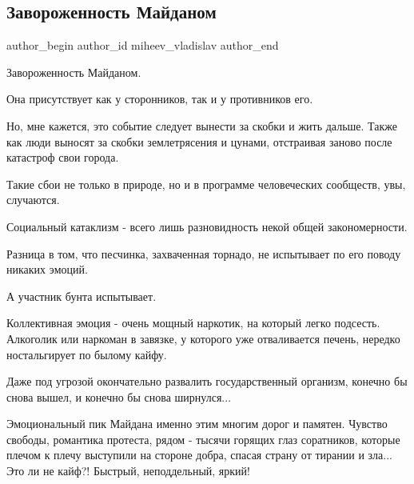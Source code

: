  
 
 
 
 
 
\subsection{Завороженность Майданом}
\label{sec:22_11_2021.fb.miheev_vladislav.1.zavorozhennost_maidan}
 
\ifcmt
 author_begin
   author_id miheev_vladislav
 author_end
\fi

Завороженность Майданом.

Она присутствует как у сторонников, так и у противников его.

Но, мне кажется, это событие следует вынести за скобки и жить дальше. Также как
люди выносят за скобки землетрясения и цунами, отстраивая заново после
катастроф свои города.

Такие сбои не только в природе, но и в программе  человеческих сообществ, увы,
случаются.

Социальный катаклизм - всего лишь разновидность некой общей закономерности.

Разница в том, что песчинка, захваченная торнадо, не испытывает по его поводу
никаких эмоций.

А участник бунта испытывает.

Коллективная эмоция - очень мощный наркотик, на который  легко подсесть.
Алкоголик или наркоман в завязке, у которого уже отваливается печень, нередко
ностальгирует по  былому кайфу.

Даже под угрозой окончательно развалить государственный организм, конечно бы
снова вышел, и конечно бы снова ширнулся...

Эмоциональный пик Майдана именно этим многим дорог и памятен. Чувство свободы,
романтика протеста,  рядом - тысячи горящих глаз соратников, которые плечом к
плечу выступили на стороне добра, спасая страну от тирании и зла... Это ли не
кайф?! Быстрый, неподдельный, яркий!


